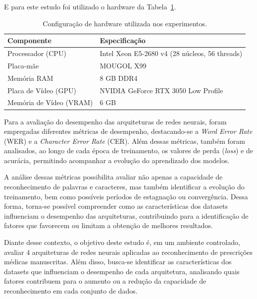 \documentclass[11pt,a4paper]{article}
\begin{document}
E para este estudo foi utilizado o hardware da Tabela~\ref{tab:hardware}.

\begin{table}[H]
	\centering
	\caption{Configuração de hardware utilizada nos experimentos.}
	\label{tab:hardware}
	\begin{tabular}{ll}
		\hline
		\textbf{Componente} & \textbf{Especificação} \\ \hline
		Processador (CPU) & Intel Xeon E5-2680 v4 (28 núcleos, 56 threads) \\
		Placa-mãe & MOUGOL X99 \\
		Memória RAM & 8 GB DDR4 \\
		Placa de Vídeo (GPU) & NVIDIA GeForce RTX 3050 Low Profile \\
		Memória de Vídeo (VRAM) & 6 GB \\ \hline
	\end{tabular}
\end{table}

Para a avaliação do desempenho das arquiteturas de redes neurais, foram empregadas diferentes métricas de desempenho, destacando-se a \textit{Word Error Rate} (WER) e a \textit{Character Error Rate} (CER). Além dessas métricas, também foram analisados, ao longo de cada época de treinamento, os valores de perda (\textit{loss}) e de acurácia, permitindo acompanhar a evolução do aprendizado dos modelos.

A análise dessas métricas possibilita avaliar não apenas a capacidade de reconhecimento de palavras e caracteres, mas também identificar a evolução do treinamento, bem como possíveis períodos de estagnação ou convergência. Dessa forma, torna-se possível compreender como as características dos datasets influenciam o desempenho das arquiteturas, contribuindo para a identificação de fatores que favorecem ou limitam a obtenção de melhores resultados.

Diante desse contexto, o objetivo deste estudo é, em um ambiente controlado, avaliar 4 arquiteturas de redes neurais aplicadas ao reconhecimento de prescrições médicas manuscritas. Além disso, busca-se identificar as características dos datasets que influenciam o desempenho de cada arquitetura, analisando quais fatores contribuem para o aumento ou a redução da capacidade de reconhecimento em cada conjunto de dados.


\end{document}
